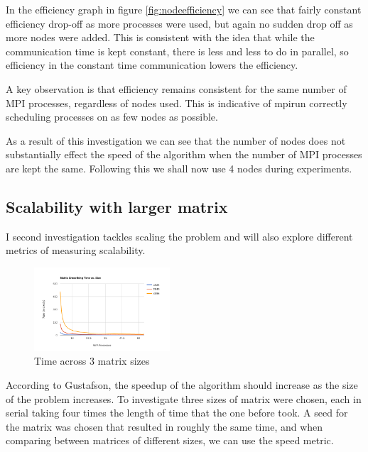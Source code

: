\documentclass[a4paper,10pt]{report}
\begin{document}
In the efficiency graph in figure \ref{fig:nodeefficiency} we can see that fairly constant efficiency drop-off as more processes were used, but again no sudden drop off as more nodes were added. This is consistent with the idea that while the communication time is kept constant, there is less and less to do in parallel, so efficiency in the constant time communication lowers the efficiency.

A key observation is that efficiency remains consistent for the same number of MPI processes, regardless of nodes used. This is indicative of mpirun correctly scheduling processes on as few nodes as possible.

As a result of this investigation we can see that the number of nodes does not substantially effect the speed of the algorithm when the number of MPI processes are kept the same. Following this we shall now use 4 nodes during experiments.

\subsection{Scalability with larger matrix}
I second investigation tackles scaling the problem and will also explore different metrics of measuring scalability.

\begin{figure}
 \centering
 \includegraphics[width=0.45\textwidth]{./images/sizes-time.png}
 \caption{Time across 3 matrix sizes}
 \label{fig:sizestime}
\end{figure}

According to Gustafson, the speedup of the algorithm should increase as the size of the problem increases. To investigate three sizes of matrix were chosen, each in serial taking four times the length of time that the one before took. A seed for the matrix was chosen that resulted in roughly the same time, and when comparing between matrices of different sizes, we can use the speed metric.
\end{document}
